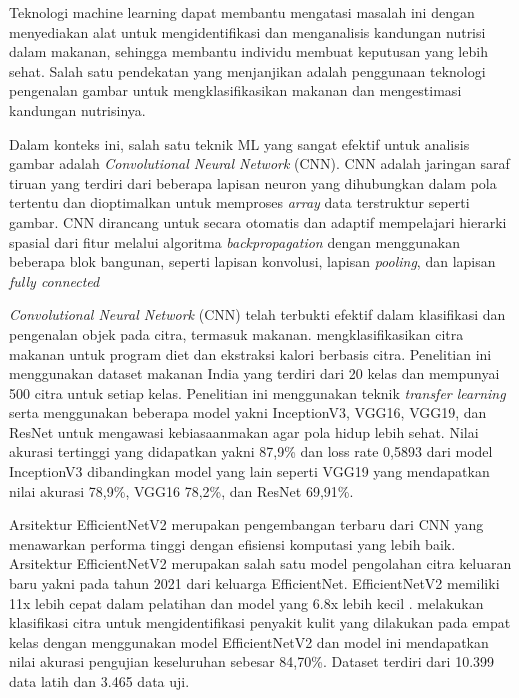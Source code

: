 Teknologi machine learning dapat membantu mengatasi masalah ini dengan menyediakan alat untuk mengidentifikasi dan menganalisis kandungan nutrisi dalam makanan, sehingga membantu individu membuat keputusan yang lebih sehat. Salah satu pendekatan yang menjanjikan adalah penggunaan teknologi pengenalan gambar untuk mengklasifikasikan makanan dan mengestimasi kandungan nutrisinya.

Dalam konteks ini, salah satu teknik ML yang sangat efektif untuk analisis gambar adalah \textit{Convolutional Neural Network} (CNN). CNN adalah jaringan saraf tiruan yang terdiri dari beberapa lapisan neuron yang dihubungkan dalam pola tertentu dan dioptimalkan untuk memproses \textit{array} data terstruktur seperti gambar. CNN dirancang untuk secara otomatis dan adaptif mempelajari hierarki spasial dari fitur melalui algoritma \textit{backpropagation} dengan menggunakan beberapa blok bangunan, seperti lapisan konvolusi, lapisan \textit{pooling}, dan lapisan \textit{fully connected} \cite{Yamashita2018}

\textit{Convolutional Neural Network} (CNN) telah terbukti efektif dalam klasifikasi dan pengenalan objek pada citra, termasuk makanan. \cite{rajayogi2019} mengklasifikasikan citra makanan untuk program diet dan ekstraksi kalori berbasis citra. Penelitian ini menggunakan dataset makanan India yang terdiri dari 20 kelas dan mempunyai 500 citra untuk setiap kelas. Penelitian ini menggunakan teknik \textit{transfer learning} serta menggunakan beberapa model yakni InceptionV3, VGG16, VGG19, dan ResNet untuk mengawasi kebiasaanmakan agar pola hidup lebih sehat. Nilai akurasi tertinggi yang didapatkan yakni 87,9\% dan loss rate 0,5893 dari model InceptionV3 dibandingkan model yang lain seperti VGG19 yang mendapatkan nilai akurasi 78,9\%, VGG16 78,2\%, dan ResNet 69,91\%.

Arsitektur EfficientNetV2 merupakan pengembangan terbaru dari CNN yang menawarkan performa tinggi dengan efisiensi komputasi yang lebih baik. Arsitektur EfficientNetV2 merupakan salah satu model pengolahan citra keluaran baru yakni pada tahun 2021 dari keluarga EfficientNet. EfficientNetV2 memiliki 11x lebih cepat dalam pelatihan dan model yang 6.8x lebih kecil \cite{tan2021}. \cite{karthik2022} melakukan klasifikasi citra untuk mengidentifikasi penyakit kulit yang dilakukan pada empat kelas dengan menggunakan model EfficientNetV2 dan model ini mendapatkan nilai akurasi pengujian keseluruhan sebesar 84,70\%. Dataset terdiri dari 10.399 data latih dan 3.465 data uji.

